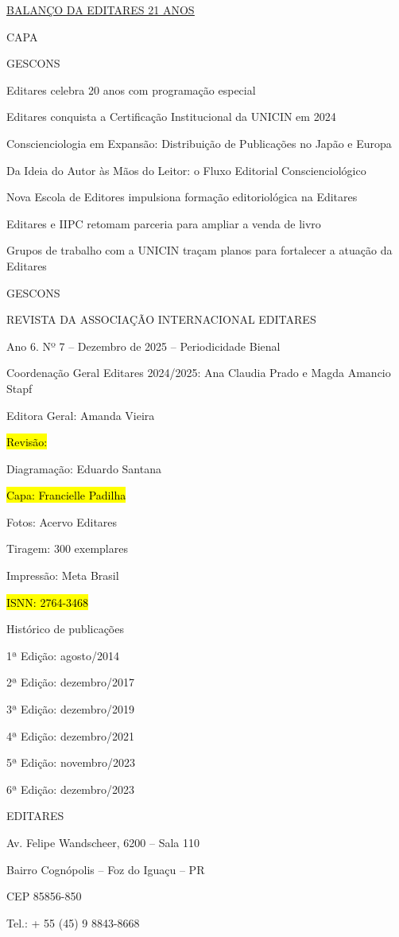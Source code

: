 \documentclass[
]{article}
\begin{document}
\hyperref[balanuxe7o-da-editares-21-anos]{\ul{BALANÇO DA EDITARES 21 ANOS}}

CAPA

GESCONS

Editares celebra 20 anos com programação especial

Editares conquista a Certificação Institucional da UNICIN em 2024

Conscienciologia em Expansão: Distribuição de Publicações no Japão e Europa

Da Ideia do Autor às Mãos do Leitor: o Fluxo Editorial Conscienciológico

Nova Escola de Editores impulsiona formação editoriológica na Editares

Editares e IIPC retomam parceria para ampliar a venda de livro

Grupos de trabalho com a UNICIN traçam planos para fortalecer a atuação da Editares

GESCONS

REVISTA DA ASSOCIAÇÃO INTERNACIONAL EDITARES

Ano 6. Nº 7 -- Dezembro de 2025 -- Periodicidade Bienal

Coordenação Geral Editares 2024/2025: Ana Claudia Prado e Magda Amancio Stapf

Editora Geral: Amanda Vieira

\hl{Revisão:}

Diagramação: Eduardo Santana

\hl{Capa: Francielle Padilha}

Fotos: Acervo Editares

Tiragem: 300 exemplares

Impressão: Meta Brasil

\hl{ISNN: 2764-3468}

Histórico de publicações

1ª Edição: agosto/2014

2ª Edição: dezembro/2017

3ª Edição: dezembro/2019

4ª Edição: dezembro/2021

5ª Edição: novembro/2023

6ª Edição: dezembro/2023

EDITARES

Av. Felipe Wandscheer, 6200 -- Sala 110

Bairro Cognópolis -- Foz do Iguaçu -- PR

CEP 85856-850

Tel.: + 55 (45) 9 8843-8668
\end{document}
